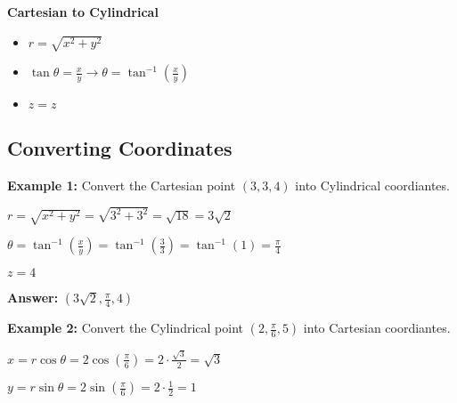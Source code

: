\documentclass[10pt]{article}                               %
\begin{document}
\begin{defaultbox}
\begin{adjustwidth}{2em}{0pt}
\begin{adjustwidth}{2em}{0pt}
            \textbf{Cartesian to Cylindrical}

            \begin{itemize}
                \item \( r = \sqrt{x^2 + y^2} \)
                \item \( \tan\theta = \frac{x}{y}  \rightarrow  \theta = \tan^{-1}\left(\frac{x}{y}\right) \)
                \item \( z = z \)
            \end{itemize}

            \begin{examplebox}

                \subsection*{Converting Coordinates}
            
                \textbf{Example 1:} Convert the Cartesian point \( \left(3,3,4\right) \) into Cylindrical coordiantes.
                \vspace{0.5em}

                \begin{adjustwidth}{2em}{0pt}

                    \( r = \sqrt{x^2 + y^2} = \sqrt{3^2 + 3^2} = \sqrt{18} = 3\sqrt{2} \)

                    \( \theta = \tan^{-1}\left(\frac{x}{y}\right) = \tan^{-1}\left(\frac{3}{3}\right) = \tan^{-1}(1) = \frac{\pi}{4} \)

                    \( z = 4 \)

                    \textbf{Answer:} \( \left(3\sqrt{2}, \frac{\pi}{4}, 4\right) \)

                \end{adjustwidth}

                \vspace{1em}

                \textbf{Example 2:} Convert the Cylindrical point \( \left(2, \frac{\pi}{6}, 5\right) \) into Cartesian coordiantes.
                \vspace{0.5em}

                \begin{adjustwidth}{2em}{0pt}

                    \( x = r\cos\theta = 2\cos\left(\frac{\pi}{6}\right) = 2 \cdot \frac{\sqrt{3}}{2} = \sqrt{3} \)

                    \( y = r\sin\theta = 2\sin\left(\frac{\pi}{6}\right) = 2 \cdot \frac{1}{2} = 1 \)


\end{adjustwidth}
\end{examplebox}
\end{adjustwidth}
\end{adjustwidth}
\end{defaultbox}
\end{document}
